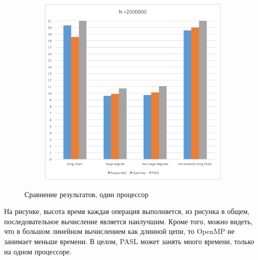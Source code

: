 \documentclass[specification,annotation]{itmo-student-thesis}
\newcommand{\revise}[1]{{\color{red!70!black} #1 }}
\begin{document}
\begin{figure}[!ht]
\begin{subfigure}[b]{0.45\textwidth}
\end{subfigure}~~\begin{subfigure}[b]{0.45\textwidth}
    \includegraphics[width=\textwidth]{pic/results-1-d.png}
\end{subfigure}
\caption{Сравнение результатов, один процессор}\label{fig:results-comparison-1}
\end{figure}

\revise{
На рисунке, высота время каждая операция выполняется, из рисунка в общем, последовательное вычисление является наилучшим. Кроме того, можно видеть, что в большом линейном вычислением как длинной цепи, то 
OpenMP не занимает меньше времени. В целом, PASL может занять много времени, только на одном процессоре.
}
\end{document}
